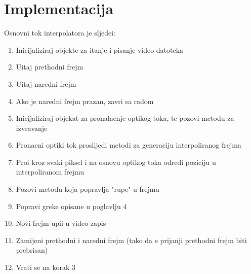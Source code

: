 
\section{Implementacija}
Osnovni tok interpolatora je sljede\cj i:
\begin{enumerate}
\item Inicijaliziraj objekte za \ch itanje i pisanje video datoteka
\item U\ch itaj prethodni frejm
\item U\ch itaj naredni frejm
\item Ako je naredni frejm prazan, zavr\sh i sa radom
\item Inicijaliziraj objekat za pronala\zh enje opti\ch kog toka, te pozovi metodu za izvr\sh avanje
\item Prona\dj eni opti\ch ki tok proslijedi metodi za generaciju interpoliranog frejma
\item Pro\dj i kroz svaki piksel i na osnovu opti\ch kog toka odredi poziciju u interpoliranom frejmu
\item Pozovi metodu koja popravlja "rupe" u frejmu
\item Popravi gre\sh ke opisane u poglavlju 4
\item Novi frejm upi\sh i u video zapis
\item Zamijeni prethodni i naredni frejm (tako da \cj e prija\sh nji prethodni frejm biti prebrisan)
\item Vrati se na korak 3
\end{enumerate}

